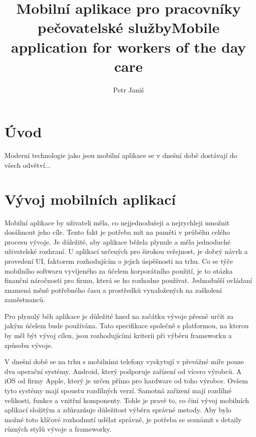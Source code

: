 \documentclass[
  biblatex,
  glossaries,
  index
]{kidiplom}
\title{Mobilní aplikace pro pracovníky pečovatelské služby}
\title[english]{Mobile application for workers of the day care}
\author{Petr Janiš}
\begin{document}
\maketitle

\section{Úvod}
Moderní technologie jako jsou mobilní aplikace se v dnešní době dostávají do všech odvětví...

\newpage

\section{Vývoj mobilních aplikací}
Mobilní aplikace by uživateli měla, co nejjednodušeji a nejrychleji umožnit dosáhnout jeho cíle. Tento fakt je potřeba mít na paměti v průběhu celého procesu vývoje. Je důležité, aby aplikace běžela plynule a měla jednoduché uživatelské rozhraní. U aplikací určených pro širokou veřejnost, je dobrý návrh a provedení UI, faktorem rozhodujícím o jejich úspěšnosti na trhu. Co se týče mobilního softwaru vyvíjeného za účelem korporátního použití, je to otázka finanční náročnosti pro firmu, která se ho rozhodne používat. Jednodušší ovládaní znamená měně potřebného času a prostředků vynaložených na zaškolení zaměstnanců.

Pro plynulý běh aplikace je důležité hned na začátku vývoje přesně určit
 za jakým účelem bude používána. Tato specifikace společně s platformou, 
 na kterou by měl být vývoj cílen, jsou rozhodujícími kriterii při výběru frameworku a způsobu vývoje.

V dnešní době se na trhu s mobilními telefony vyskytují v převážné míře pouze dva operační systémy. Android, který podporuje zařízení od vícero výrobců. A iOS od firmy Apple, který je určen přímo pro hardware od toho výrobce. Ovšem tyto systémy mají spoustu rozdílných verzí. Samotná zařízení mají rozdílné velikosti, funkce a vnitřní komponenty. Tohle je pravě to, co činí vývoj mobilních aplikací složitým a zdůrazňuje důležitost výběru správné metody. Aby bylo možné toto klíčové rozhodnutí udělat správně, je potřeba se seznámit s detaily různých stylů vývoje a frameworky.
\end{document}
